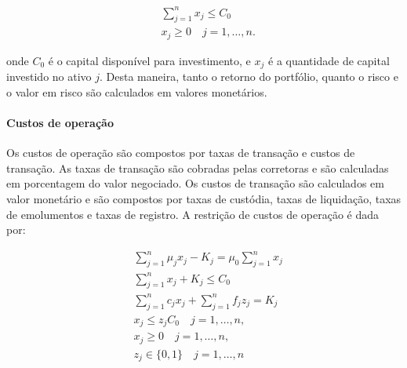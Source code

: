                     \begin{equation}
                        \begin{aligned}
                            & \sum_{j=1}^{n} x_{j} \leq C_{0} \\
                            & x_{j} \geq 0 \quad j=1, \ldots, n \text{.}
                        \end{aligned}
                    \end{equation}

                    \noindent onde $C_{0}$ é o capital disponível para investimento, e $x_{j}$ é a quantidade de capital investido no ativo $j$. Desta maneira, tanto o retorno do portfólio, quanto o risco e o valor em risco são calculados em valores monetários.
                    
                \paragraph{Custos de operação}

                    \ipar Os custos de operação são compostos por taxas de transação e custos de transação. As taxas de transação são cobradas pelas corretoras e são calculadas em porcentagem do valor negociado. Os custos de transação são calculados em valor monetário e são compostos por taxas de custódia, taxas de liquidação, taxas de emolumentos e taxas de registro. A restrição de custos de operação é dada por:

                    \begin{equation}
                        \begin{aligned}
                        & \sum_{j=1}^{n}\mu_{j}x_{j}- K_{j} = \mu_{0} \sum_{j=1}^{n}x_{j}\\
                        & \sum_{j=1}^{n} x_{j} + K_{j} \leq C_{0} \\
                        & \sum_{j=1}^{n}c_{j}x_{j} + \sum_{j=1}^{n} f_{j} z_{j} = K_{j} \\
                        & x_{j} \leq z_{j} C_{0} \quad j=1, \ldots, n \text{,} \\
                        & x_{j} \geq 0 \quad j=1, \ldots, n \text{,} \\
                        & z_{j} \in\{0,1\} \quad j=1, \ldots, n \\
                        \end{aligned}
                    \end{equation}

